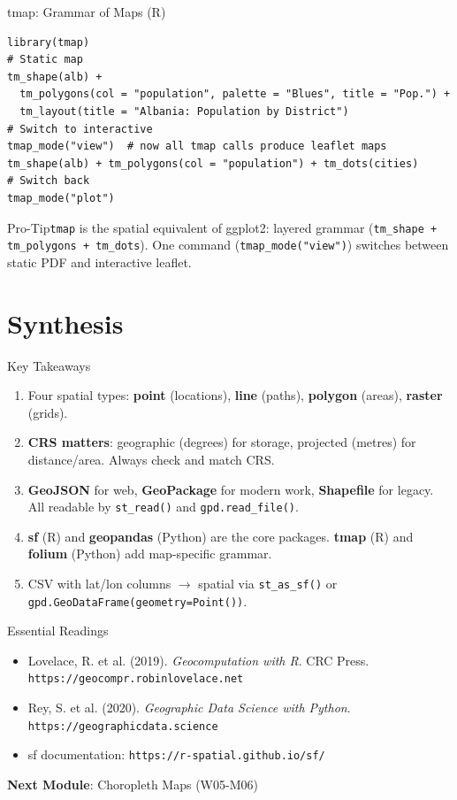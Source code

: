 \documentclass[10pt]{beamer}
\begin{document}
\begin{frame}[fragile]{tmap: Grammar of Maps (R)}
\begin{lstlisting}[style=rstyle]
library(tmap)
# Static map
tm_shape(alb) +
  tm_polygons(col = "population", palette = "Blues", title = "Pop.") +
  tm_layout(title = "Albania: Population by District")
# Switch to interactive
tmap_mode("view")  # now all tmap calls produce leaflet maps
tm_shape(alb) + tm_polygons(col = "population") + tm_dots(cities)
# Switch back
tmap_mode("plot")
\end{lstlisting}
\begin{alertblock}{Pro-Tip}\texttt{tmap} is the spatial equivalent of ggplot2: layered grammar (\texttt{tm\_shape + tm\_polygons + tm\_dots}). One command (\texttt{tmap\_mode("view")}) switches between static PDF and interactive leaflet.\end{alertblock}
\end{frame}
\section{Synthesis}
\begin{frame}{Key Takeaways}
\begin{enumerate}\item Four spatial types: \textbf{point} (locations), \textbf{line} (paths), \textbf{polygon} (areas), \textbf{raster} (grids).\item \textbf{CRS matters}: geographic (degrees) for storage, projected (metres) for distance/area. Always check and match CRS.\item \textbf{GeoJSON} for web, \textbf{GeoPackage} for modern work, \textbf{Shapefile} for legacy. All readable by \texttt{st\_read()} and \texttt{gpd.read\_file()}.\item \textbf{sf} (R) and \textbf{geopandas} (Python) are the core packages. \textbf{tmap} (R) and \textbf{folium} (Python) add map-specific grammar.\item CSV with lat/lon columns $\rightarrow$ spatial via \texttt{st\_as\_sf()} or \texttt{gpd.GeoDataFrame(geometry=Point())}.\end{enumerate}
\end{frame}
\begin{frame}{Essential Readings}
\begin{itemize}\item Lovelace, R. et al. (2019). \emph{Geocomputation with R}. CRC Press. \texttt{https://geocompr.robinlovelace.net}\item Rey, S. et al. (2020). \emph{Geographic Data Science with Python}. \texttt{https://geographicdata.science}\item sf documentation: \texttt{https://r-spatial.github.io/sf/}\end{itemize}\vspace{6pt}\textbf{Next Module}: Choropleth Maps (W05-M06)
\end{frame}
\end{document}
